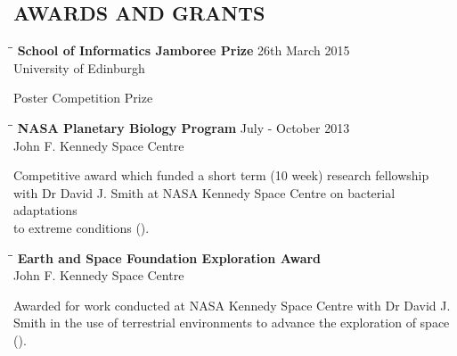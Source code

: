 \documentclass{res}
\begin{document}
\begin{resume}
\section{AWARDS AND GRANTS}

  \begin{tabbing}
   \hspace{2in}\= \hspace{2.6in}\= \kill 
    {\bf School of Informatics Jamboree Prize} \> \> 26th March 2015\\
                            \> 
                            \> University of Edinburgh\\

   \end{tabbing}\vspace{-30pt}
   Poster Competition Prize 
   \vspace{-0.05in}  

  \begin{tabbing}
   \hspace{2in}\= \hspace{2.6in}\= \kill 
    {\bf NASA Planetary Biology Program} \> \>July - October 2013\\
                            \> 
                            \> John F. Kennedy Space Centre\\

   \end{tabbing}\vspace{-30pt}     
   Competitive award which funded a short term (10 week) research fellowship \\ with Dr David J. Smith at NASA Kennedy Space Centre on bacterial adaptations \\ to extreme conditions ().

   \vspace{-0.1in}  
 
   
   \begin{tabbing}
   \hspace{2in}\= \hspace{2.6in}\= \kill 
    {\bf Earth and Space Foundation Exploration Award} \> \\
                            \> 
                            \> John F. Kennedy Space Centre\\


   \end{tabbing}\vspace{-30pt}     
   Awarded for work conducted at NASA Kennedy Space Centre with Dr David J. \\ Smith in the use of terrestrial environments to advance the exploration of space ().


\end{resume}
\end{document}
